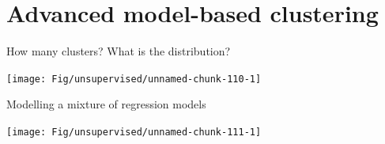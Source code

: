 \documentclass[
  ignorenonframetext,
  aspectratio=169]{beamer}
\begin{document}
\hypertarget{advanced-model-based-clustering}{%
\section{Advanced model-based
clustering}\label{advanced-model-based-clustering}}

\begin{frame}{How many clusters? What is the distribution?}
\protect\hypertarget{how-many-clusters-what-is-the-distribution}{}
\scriptsize

\normalsize

\scriptsize

\normalsize

\scriptsize

\begin{center}\texttt{[image: Fig/unsupervised/unnamed-chunk-110-1]} \end{center}

\normalsize
\end{frame}

\begin{frame}{Modelling a mixture of regression models}
\protect\hypertarget{modelling-a-mixture-of-regression-models}{}
\scriptsize

\begin{center}\texttt{[image: Fig/unsupervised/unnamed-chunk-111-1]} \end{center}

\normalsize
\end{frame}
\end{document}
